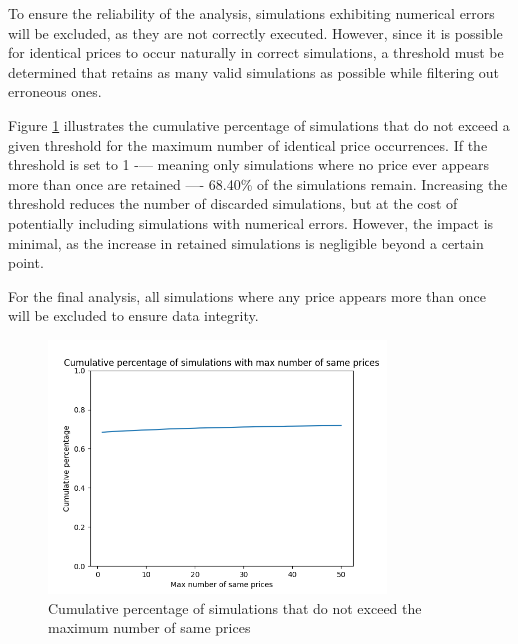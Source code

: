 To ensure the reliability of the analysis, simulations exhibiting numerical errors will be excluded, as they are not correctly executed. However, since it is possible for identical prices to occur naturally in correct simulations, a threshold must be determined that retains as many valid simulations as possible while filtering out erroneous ones.

Figure \ref{fig:max_number_of_same_prices_cumulative_percentage} illustrates the cumulative percentage of simulations that do not exceed a given threshold for the maximum number of identical price occurrences. If the threshold is set to 1 -— meaning only simulations where no price ever appears more than once are retained —- 68.40\% of the simulations remain. Increasing the threshold reduces the number of discarded simulations, but at the cost of potentially including simulations with numerical errors. However, the impact is minimal, as the increase in retained simulations is negligible beyond a certain point.

For the final analysis, all simulations where any price appears more than once will be excluded to ensure data integrity.

\begin{figure}
    \centering
    \includegraphics[width=0.8\textwidth]{img/max_number_of_same_prices_cumulative_percentage.png}
    \caption{Cumulative percentage of simulations that do not exceed the maximum number of same prices}
    \label{fig:max_number_of_same_prices_cumulative_percentage}
\end{figure}

